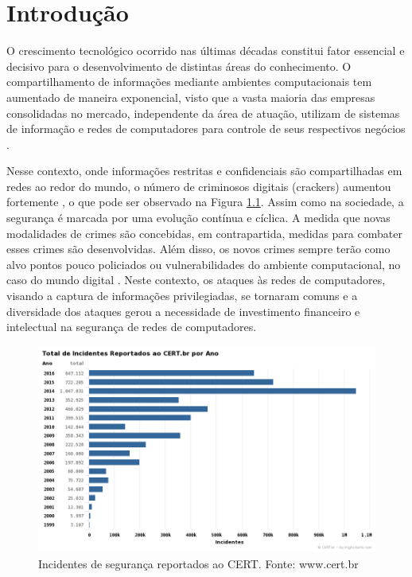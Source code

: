 \chapter{Introdução}
\label{introducao}

O crescimento tecnológico ocorrido nas últimas décadas constitui fator essencial e decisivo para o desenvolvimento de distintas áreas do conhecimento. O compartilhamento de informações mediante ambientes computacionais tem aumentado de maneira exponencial, visto que a vasta maioria das empresas consolidadas no mercado, independente da área de atuação, utilizam de sistemas de informação e redes de computadores para controle de seus respectivos negócios \cite{machado2005}.

Nesse contexto, onde informações restritas e confidenciais são compartilhadas em redes ao redor do mundo, o número de criminosos digitais (crackers) aumentou fortemente  \cite{nakamura2002}, o que pode ser observado na Figura \ref{fig:cert}. Assim como na sociedade, a segurança é marcada por uma evolução contínua e cíclica. A medida que novas modalidades de crimes são concebidas, em contrapartida, medidas para combater esses crimes são desenvolvidas. Além disso, os novos crimes sempre terão como alvo pontos pouco policiados ou vulnerabilidades do ambiente computacional, no caso do mundo digital \cite{nakamura2002}. Neste contexto, os ataques às redes de computadores, visando a captura de informações privilegiadas, se tornaram comuns e a diversidade dos ataques gerou a necessidade de investimento financeiro e intelectual na segurança de redes de computadores.

\begin{figure}[ht]
    \centering
    \includegraphics[scale=0.5]{Cap1/cert.png}
    \caption{Incidentes de segurança reportados ao CERT. Fonte: www.cert.br}
    \label{fig:cert}
\end{figure}


